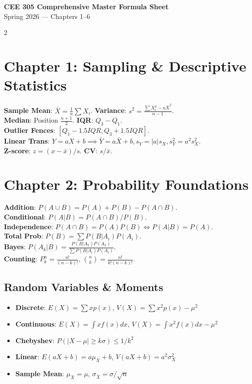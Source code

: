 \documentclass[10pt]{article}
\begin{document}
\begin{center}
{\huge \textbf{CEE 305 Comprehensive Master Formula Sheet}} \\
Spring 2026 --- Chapters 1--6
\end{center}

\begin{multicols}{2}

\section*{Chapter 1: Sampling \& Descriptive Statistics}
\textbf{Sample Mean}: $\bar{X} = \frac{1}{n}\sum X_i$. \textbf{Variance}: $s^2 = \frac{\sum X_i^2 - n\bar{X}^2}{n-1}$. \\
\textbf{Median}: Position $\frac{n+1}{2}$. \textbf{IQR}: $Q_3 - Q_1$. \\
\textbf{Outlier Fences}: $[Q_1 - 1.5IQR, Q_3 + 1.5IQR]$. \\
\textbf{Linear Trans}: $Y = aX+b \implies \bar{Y} = a\bar{X}+b, s_Y = |a|s_X, s_Y^2 = a^2s_X^2$. \\
\textbf{Z-score}: $z = (x-\bar{x})/s$. \textbf{CV}: $s/\bar{x}$.

\section*{Chapter 2: Probability Foundations}
\textbf{Addition}: $P(A \cup B) = P(A) + P(B) - P(A \cap B)$. \\
\textbf{Conditional}: $P(A|B) = P(A \cap B)/P(B)$. \\
\textbf{Independence}: $P(A \cap B) = P(A)P(B) \iff P(A|B) = P(A)$. \\
\textbf{Total Prob}: $P(B) = \sum P(B|A_i)P(A_i)$. \\
\textbf{Bayes}: $P(A_k|B) = \frac{P(B|A_k)P(A_k)}{\sum P(B|A_i)P(A_i)}$. \\
\textbf{Counting}: $P^n_k = \frac{n!}{(n-k)!}$, $\binom{n}{k} = \frac{n!}{k!(n-k)!}$.

\subsection*{Random Variables \& Moments}
\begin{itemize}
    \item \textbf{Discrete}: $E(X) = \sum x p(x)$, $V(X) = \sum x^2 p(x) - \mu^2$
    \item \textbf{Continuous}: $E(X) = \int x f(x)dx$, $V(X) = \int x^2 f(x)dx - \mu^2$
    \item \textbf{Chebyshev}: $P(|X-\mu| \geq k\sigma) \leq 1/k^2$
    \item \textbf{Linear}: $E(aX+b) = a\mu_X + b$, $V(aX+b) = a^2\sigma_X^2$
    \item \textbf{Sample Mean}: $\mu_{\bar{X}} = \mu$, $\sigma_{\bar{X}} = \sigma/\sqrt{n}$
\end{itemize}


\end{multicols}
\end{document}

